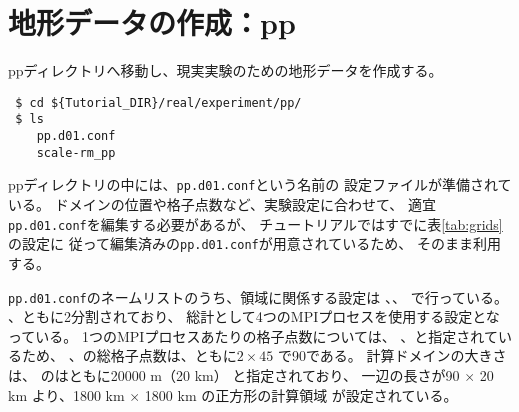 \section{地形データの作成：pp} \label{sec:tutrial_real_pp}

ppディレクトリへ移動し、現実実験のための地形データを作成する。
\begin{verbatim}
 $ cd ${Tutorial_DIR}/real/experiment/pp/
 $ ls
    pp.d01.conf
    scale-rm_pp
\end{verbatim}
ppディレクトリの中には、\verb|pp.d01.conf|という名前の
設定ファイルが準備されている。
ドメインの位置や格子点数など、実験設定に合わせて、
適宜\verb|pp.d01.conf|を編集する必要があるが、
チュートリアルではすでに表\ref{tab:grids}の設定に
従って編集済みの\verb|pp.d01.conf|が用意されているため、
そのまま利用する。

\verb|pp.d01.conf|のネームリストのうち、領域に関係する設定は
、、
で行っている。
{\XDIR} 、{\YDIR}ともに2分割されており、
総計として4つのMPIプロセスを使用する設定となっている。
1つのMPIプロセスあたりの格子点数については、
、と指定されているため、
{\XDIR} 、{\YDIR}の総格子点数は、ともに$2 \times 45$ で90である。
計算ドメインの大きさは、
のはともに20000 m（20 km）
と指定されており、
一辺の長さが90 $\times$ 20 km より、1800 km $\times$ 1800 km の正方形の計算領域
が設定されている。\\

